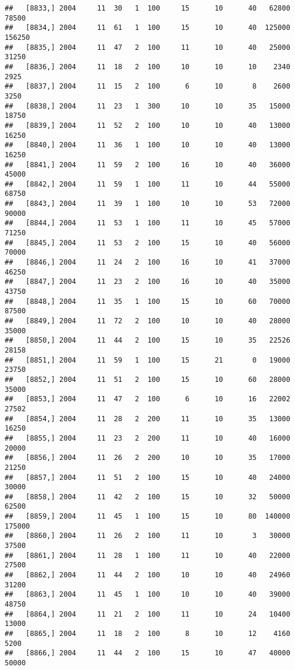 \documentclass{article}\usepackage[]{graphicx}\usepackage[]{color}
\makeatletter
\newenvironment{kframe}{%
 \def\at@end@of@kframe{}%
 \ifinner\ifhmode%
  \def\at@end@of@kframe{\end{minipage}}%
  \begin{minipage}{\columnwidth}%
 \fi\fi%
 \def\FrameCommand##1{\hskip\@totalleftmargin \hskip-\fboxsep
 \colorbox{shadecolor}{##1}\hskip-\fboxsep
     \hskip-\linewidth \hskip-\@totalleftmargin \hskip\columnwidth}%
 \MakeFramed {\advance\hsize-\width
   \@totalleftmargin\z@ \linewidth\hsize
   \@setminipage}}%
 {\par\unskip\endMakeFramed%
 \at@end@of@kframe}
\newenvironment{knitrout}{}{} %
\makeatother
\begin{document}
\begin{knitrout}
\begin{kframe}
\begin{verbatim}
##   [8833,] 2004     11  30   1  100     15      10      40   62800   78500
##   [8834,] 2004     11  61   1  100     15      10      40  125000  156250
##   [8835,] 2004     11  47   2  100     11      10      40   25000   31250
##   [8836,] 2004     11  18   2  100     10      10      10    2340    2925
##   [8837,] 2004     11  15   2  100      6      10       8    2600    3250
##   [8838,] 2004     11  23   1  300     10      10      35   15000   18750
##   [8839,] 2004     11  52   2  100     10      10      40   13000   16250
##   [8840,] 2004     11  36   1  100     10      10      40   13000   16250
##   [8841,] 2004     11  59   2  100     16      10      40   36000   45000
##   [8842,] 2004     11  59   1  100     11      10      44   55000   68750
##   [8843,] 2004     11  39   1  100     10      10      53   72000   90000
##   [8844,] 2004     11  53   1  100     11      10      45   57000   71250
##   [8845,] 2004     11  53   2  100     15      10      40   56000   70000
##   [8846,] 2004     11  24   2  100     16      10      41   37000   46250
##   [8847,] 2004     11  23   2  100     16      10      40   35000   43750
##   [8848,] 2004     11  35   1  100     15      10      60   70000   87500
##   [8849,] 2004     11  72   2  100     10      10      40   28000   35000
##   [8850,] 2004     11  44   2  100     15      10      35   22526   28158
##   [8851,] 2004     11  59   1  100     15      21       0   19000   23750
##   [8852,] 2004     11  51   2  100     15      10      60   28000   35000
##   [8853,] 2004     11  47   2  100      6      10      16   22002   27502
##   [8854,] 2004     11  28   2  200     11      10      35   13000   16250
##   [8855,] 2004     11  23   2  200     11      10      40   16000   20000
##   [8856,] 2004     11  26   2  200     10      10      35   17000   21250
##   [8857,] 2004     11  51   2  100     15      10      40   24000   30000
##   [8858,] 2004     11  42   2  100     15      10      32   50000   62500
##   [8859,] 2004     11  45   1  100     15      10      80  140000  175000
##   [8860,] 2004     11  26   2  100     11      10       3   30000   37500
##   [8861,] 2004     11  28   1  100     11      10      40   22000   27500
##   [8862,] 2004     11  44   2  100     10      10      40   24960   31200
##   [8863,] 2004     11  45   1  100     10      10      40   39000   48750
##   [8864,] 2004     11  21   2  100     11      10      24   10400   13000
##   [8865,] 2004     11  18   2  100      8      10      12    4160    5200
##   [8866,] 2004     11  44   2  100     15      10      47   40000   50000

\end{verbatim}
\end{kframe}
\end{knitrout}
\end{document}
